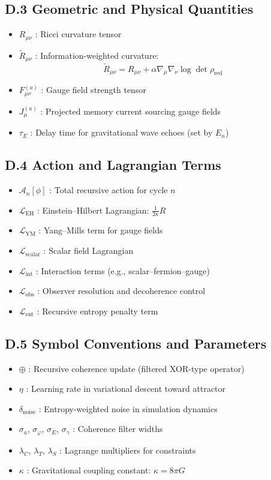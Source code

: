 \subsection*{D.3 Geometric and Physical Quantities}

\begin{itemize}[leftmargin=1.5em]
  \item $R_{\mu\nu}$ : Ricci curvature tensor
  \item $\widetilde{R}_{\mu\nu}$ : Information-weighted curvature:
  \[
  \widetilde{R}_{\mu\nu} = R_{\mu\nu} + \alpha \nabla_\mu \nabla_\nu \log \det \rho_{\text{red}}
  \]
  \item $F_{\mu\nu}^{(a)}$ : Gauge field strength tensor
  \item $J_\mu^{(a)}$ : Projected memory current sourcing gauge fields
  \item $\tau_E$ : Delay time for gravitational wave echoes (set by $E_n$)
\end{itemize}

\subsection*{D.4 Action and Lagrangian Terms}

\begin{itemize}[leftmargin=1.5em]
  \item $\mathcal{A}_n[\phi]$ : Total recursive action for cycle $n$
  \item $\mathcal{L}_{\text{EH}}$ : Einstein–Hilbert Lagrangian: $\frac{1}{2\kappa} R$
  \item $\mathcal{L}_{\text{YM}}$ : Yang–Mills term for gauge fields
  \item $\mathcal{L}_{\text{scalar}}$ : Scalar field Lagrangian
  \item $\mathcal{L}_{\text{int}}$ : Interaction terms (e.g., scalar–fermion–gauge)
  \item $\mathcal{L}_{\text{obs}}$ : Observer resolution and decoherence control
  \item $\mathcal{L}_{\text{ent}}$ : Recursive entropy penalty term
\end{itemize}

\subsection*{D.5 Symbol Conventions and Parameters}

\begin{itemize}[leftmargin=1.5em]
  \item $\oplus$ : Recursive coherence update (filtered XOR-type operator)
  \item $\eta$ : Learning rate in variational descent toward attractor
  \item $\delta_{\text{noise}}$ : Entropy-weighted noise in simulation dynamics
  \item $\sigma_a$, $\sigma_\varphi$, $\sigma_E$, $\sigma_\gamma$ : Coherence filter widths
  \item $\lambda_C$, $\lambda_T$, $\lambda_S$ : Lagrange multipliers for constraints
  \item $\kappa$ : Gravitational coupling constant: $\kappa = 8\pi G$
\end{itemize}
